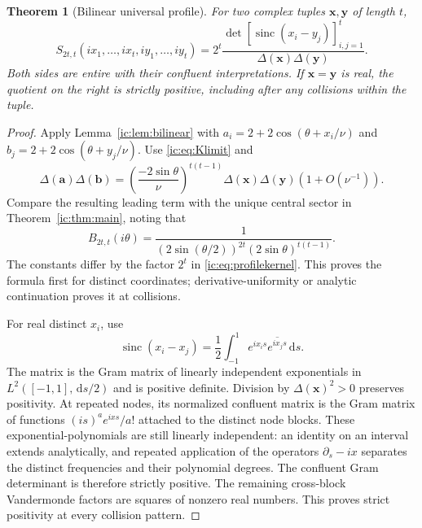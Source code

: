 \documentclass[11pt,a4paper]{article}
\numberwithin{equation}{section}
\newtheorem{theorem}{Theorem}[section]
\theoremstyle{definition}
\theoremstyle{remark}
\newcommand{\dd}{\mathrm d}
\newcommand{\by}{\boldsymbol{y}}
\newcommand{\Del}{\Delta}
\newcommand{\sinc}{\operatorname{sinc}}
\newcommand{\bx}{\boldsymbol x}
\begin{document}
\begin{theorem}[Bilinear universal profile]\label{ic:thm:profilekernel}
For two complex tuples $\bx,\by$ of length $t$,
\begin{equation}\label{ic:eq:profilekernel}
 S_{2t,t}(ix_1,\ldots,ix_t,iy_1,\ldots,iy_t)
 =2^t\frac{\det[\sinc(x_i-y_j)]_{i,j=1}^t}
 {\Del(\bx)\Del(\by)}.
\end{equation}
Both sides are entire with their confluent interpretations. If
$\bx=\by$ is real, the quotient on the right is strictly positive,
including after any collisions within the tuple.
\end{theorem}
\begin{proof}
Apply Lemma~\ref{ic:lem:bilinear} with
$a_i=2+2\cos(\theta+x_i/\nu)$ and
$b_j=2+2\cos(\theta+y_j/\nu)$. Use \eqref{ic:eq:Klimit} and
\[
 \Del(\boldsymbol a)\Del(\boldsymbol b)
 =\left(\frac{-2\sin\theta}{\nu}\right)^{t(t-1)}
   \Del(\bx)\Del(\by)(1+O(\nu^{-1})).
\]
Compare the resulting leading term with the unique central sector in
Theorem~\ref{ic:thm:main}, noting that
\begin{equation}\label{ic:eq:Bcentral}
 B_{2t,t}(i\theta)=
 \frac1{(2\sin(\theta/2))^{2t}(2\sin\theta)^{t(t-1)}}.
\end{equation}
The constants differ by the factor $2^t$ in
\eqref{ic:eq:profilekernel}. This proves the formula first for distinct
coordinates; derivative-uniformity or analytic continuation proves it
at collisions.

For real distinct $x_i$, use
\[
 \sinc(x_i-x_j)=\frac12\int_{-1}^1e^{ix_is}\overline{e^{ix_js}}\,\dd s.
\]
The matrix is the Gram matrix of linearly independent exponentials in
$L^2([-1,1],\,\dd s/2)$ and is positive definite. Division by
$\Del(\bx)^2>0$ preserves positivity. At repeated nodes, its normalized
confluent matrix is the Gram matrix of functions
$(is)^a e^{ixs}/a!$ attached to the distinct node blocks. These
exponential-polynomials are still linearly independent: an identity on
an interval extends analytically, and repeated application of the
operators $\partial_s-ix$ separates the distinct frequencies and their
polynomial degrees. The confluent Gram determinant is therefore
strictly positive. The remaining cross-block Vandermonde factors are
squares of nonzero real numbers. This proves strict positivity at every
collision pattern.
\end{proof}
\end{document}
